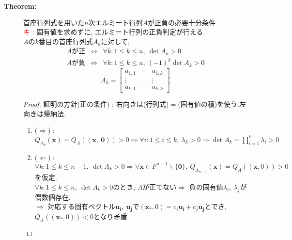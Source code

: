 \documentclass[dvipdfmx]{jsarticle}
\newcommand*{\point}{\textcircled{\textcolor{red}{\scriptsize キ}} }
\begin{document}
\begin{description}
    \item[\bf{Theorem:}] 首座行列式を用いた$n$次エルミート行列$A$が正負の必要十分条件 \\
        \point : 固有値を求めずに, エルミート行列の正負判定が行える.\\
        $A$の$k$番目の首座行列式$A_k$に対して, 
        \begin{eqnarray*}
            A\text{が正} &\Leftrightarrow& \forall k : 1 \leq k \leq n,\ \det A_k > 0 \\
            A\text{が負} &\Leftrightarrow& \forall k : 1 \leq k \leq n,\ (-1)^k\det A_k > 0
        \end{eqnarray*}
        $$
            A_k = \begin{bmatrix}
                a_{1,1} & \cdots & a_{1,k} \\
                \vdots & & \vdots \\
                a_{k,1} & \cdots & a_{k,k}
            \end{bmatrix} 
        $$
        \begin{proof} 証明の方針(正の条件) : 右向きは(行列式)$=$(固有値の積)を使う.左向きは帰納法.
            \begin{enumerate}
                \item ($\Rightarrow$) : $Q_{A_k}(\bm{x}) = Q_A(( \bm{x},\ \bm{0} )) > 0 \Leftrightarrow \forall i : 1 \leq i \leq k,\ \lambda_k > 0 \Rightarrow \det A_k = \prod_{i=1}^k \lambda_i > 0$
                \item ($\Leftarrow$) : $\forall k : 1 \leq k \leq n-1,\ \det A_k > 0 \Rightarrow \forall \bm{x} \in F^{n-1} \backslash \{ \bm{0} \},\ Q_{A_{n-1}}(\bm{x})=Q_{A}((\bm{x}, 0)) > 0$を仮定. \\
                    $\forall k : 1 \leq k \leq n,\ \det A_k > 0$のとき, $A$が正でない$\Rightarrow$ 負の固有値$\lambda_i,\ \lambda_j$が偶数個存在. \\
                    $\Rightarrow$ 対応する固有ベクトル$\bm{u_i},\ \bm{u_j}$で$(\bm{x}_*,0) = c_i\bm{u_i} + c_j\bm{u_j}$とでき, $Q_{A}((\bm{x}_*,0)) < 0$となり矛盾.
            \end{enumerate}
        \end{proof}

\end{description}
\end{document}
